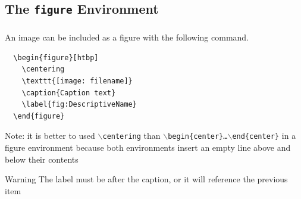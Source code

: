 \documentclass[article]{beamer}
\begin{document}
\subsection{The \texttt{figure} Environment}
\begin{frame}
  \frametitle{\thesubsection}
  \framesubtitle{}
  An image can be included as a figure with the following command.
  \begin{verbatim}
  \begin{figure}[htbp]
    \centering
    \texttt{[image: filename]}
    \caption{Caption text}
    \label{fig:DescriptiveName} 
  \end{figure}
  \end{verbatim}
  \vspace{-12pt}
  Note: it is better to used \texttt{$\backslash$centering} than
  \texttt{$\backslash$begin\{center\}\ldots$\backslash$end\{center\}} in a
  figure environment because both environments insert an empty line above and
  below their contents
  \begin{alertblock}{Warning}
    The label must be after the caption, or it will reference the previous
    item
  \end{alertblock}
\end{frame}
\end{document}
